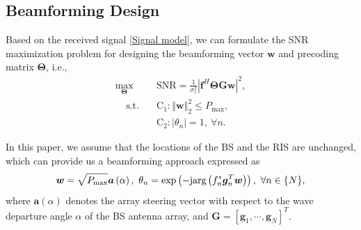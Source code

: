 \documentclass[journal,twocolumn]{IEEEtran}
\theoremstyle{nonumberplain}
\def \exp {\text{exp}}
\def \arg {\text{arg}}
\begin{document}
        \subsection{Beamforming Design}
        \label{Beamforming design}
        Based on the received signal \eqref{Signal model}, we can formulate the \ac{SNR} maximization problem for designing the beamforming vector $\bm w$ and precoding matrix $\bm \Theta$, i.e.,
        \begin{subequations}
            \label{optimization}
            \begin{align}
            \label{objective}
                \max_{\bm \Theta}~~&\text{SNR}=\frac{1}{\sigma_{z}^{2}}
                \left\vert
                \bm f^{H}\bm \Theta\bm G\bm w \right\vert^{2},\\
            \label{constraint}
                ~~~~~\text{s.t.~~~}&\text{C}_{1}: \left\Vert \bm w\right \Vert_{2}^{2}\leq P_{\text{max}},\\
                &\text{C}_{2}: \left\vert\theta_{n}\right\vert=1,~\forall n.
            \end{align}
        \end{subequations}
        
    In this paper, we assume that the locations of the \ac{BS} and the RIS are unchanged, which can provide us a beamforming approach expressed as
    \begin{equation}
        \label{traditional beamforming}
        \bm w=\sqrt{P_{\rm max}}\bm a\left(\alpha\right),~ \theta_{n} = \exp\left(-{\rm j} \arg\left(f_{n}^{*}\bm g_{n}^{T}\bm w\right)\right),~\forall n\in \{N\},
    \end{equation}
    where $\bm a(\alpha)$ denotes the array steering vector with respect to the wave departure angle $\alpha$ of the BS antenna array, and $\bm G = \left[\bm g_{1}, \cdots, \bm g_{N}\right]^{T}$.
\end{document}

